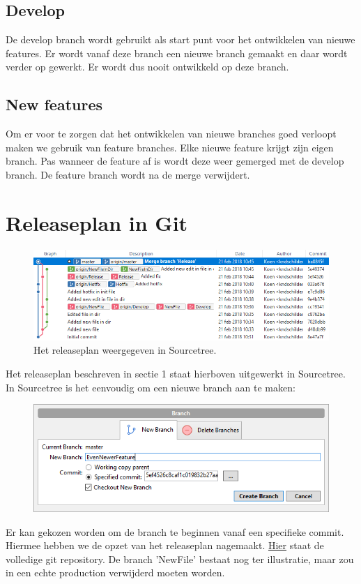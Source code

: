 \documentclass[12pt]{article}
\begin{document}
\subsection{Develop}
De develop branch wordt gebruikt als start punt voor het ontwikkelen van nieuwe features. Er wordt vanaf deze branch een nieuwe branch gemaakt en daar wordt verder op gewerkt. Er wordt dus nooit ontwikkeld op deze branch.
\subsection{New features}
Om er voor te zorgen dat het ontwikkelen van nieuwe branches goed verloopt maken we gebruik van feature branches. Elke nieuwe feature krijgt zijn eigen branch. Pas wanneer de feature af is wordt deze weer gemerged met de develop branch. De feature branch wordt na de merge verwijdert.



\pagebreak
\section{Releaseplan in Git}
\begin{figure}[H]
	\includegraphics[width=\textwidth]{images/ReleasePlanInGit.png}
	\caption{Het releaseplan weergegeven in Sourcetree.}
\end{figure}
Het releaseplan beschreven in sectie 1 staat hierboven uitgewerkt in Sourcetree. In Sourcetree is het eenvoudig om een nieuwe branch aan te maken:

\begin{figure}[H]
	\centering
	\includegraphics[width=\textwidth]{images/NewBranch.png}
\end{figure}

Er kan gekozen worden om de branch te beginnen vanaf een specifieke commit. Hiermee hebben we de opzet van het releaseplan nagemaakt.
\href{https://github.com/kndschilders/ReleasePlanGitTest}{Hier}
staat de volledige git repository. De branch 'NewFile' bestaat nog ter illustratie, maar zou in een echte production verwijderd moeten worden.
\end{document}
